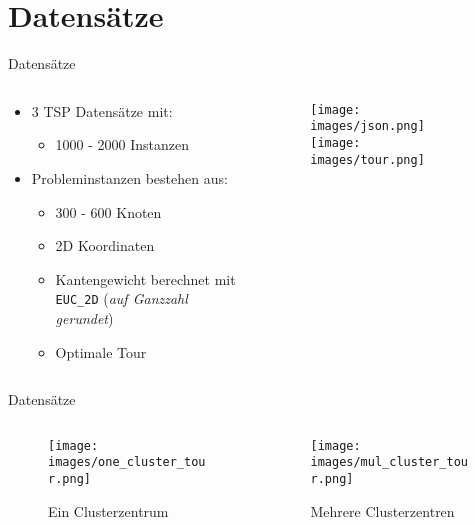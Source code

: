 \section{Datensätze}
\begin{frame}{Datensätze}
\begin{columns}
    \begin{column}{0.5\textwidth}
            \begin{itemize}
        \item 3 TSP Datensätze mit:
        \begin{itemize}
            \item 1000 - 2000 Instanzen
        \end{itemize}
        \item Probleminstanzen bestehen aus:
        \begin{itemize}
            \item 300 - 600 Knoten
            \item 2D Koordinaten
            \item Kantengewicht berechnet mit \texttt{EUC\_2D} (\textit{auf Ganzzahl gerundet})
            \item Optimale Tour
        \end{itemize}
    \end{itemize}
    \end{column}
    \begin{column}{0.5\textwidth}
\begin{figure}
    \centering
    \texttt{[image: images/json.png]}
    \texttt{[image: images/tour.png]}
    \label{fig:enter-label}
\end{figure}
    \end{column}
\end{columns}
\end{frame}
\begin{frame}{Datensätze}
    \begin{columns}
        \begin{column}{0.5\textwidth}
            \begin{figure}
                \centering
                \texttt{[image: images/one\_cluster\_tour.png]}
                \caption{Ein Clusterzentrum}
            \end{figure}
        \end{column}
        \begin{column}{0.5\textwidth}
            \begin{figure}
                \centering
                \texttt{[image: images/mul\_cluster\_tour.png]}
                \caption{Mehrere Clusterzentren}
            \end{figure}
        \end{column}
    \end{columns}
\end{frame}

